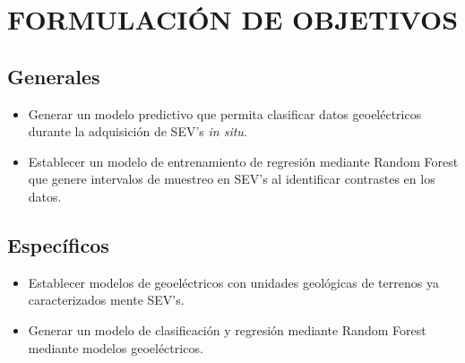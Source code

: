 \chapter{FORMULACIÓN DE OBJETIVOS}

\section{Generales}

\begin{itemize}
	\item Generar un modelo predictivo que permita clasificar datos geoeléctricos durante la adquisición de SEV's \textit{in situ}.
	\item Establecer un modelo de entrenamiento de regresión mediante Random Forest que genere intervalos de muestreo en SEV's al identificar contrastes en los datos.
\end{itemize}

\section{Específicos}


\begin{itemize}
	\item Establecer modelos de geoeléctricos con unidades geológicas de terrenos ya caracterizados mente SEV's.
	\item Generar un modelo de clasificación y regresión mediante Random Forest mediante modelos geoeléctricos.
\end{itemize}
